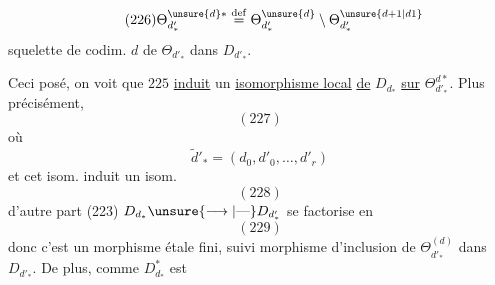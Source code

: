 \[
\tag{226}
\Theta_{d'_*}^{\unsure{d}*}\overset{\mathrm{def}}=
\Theta_{d'_*}^{\unsure{d}}\setminus\Theta_{d'_*}^{\unsure{d+1|d1}}
\]
squelette 
de codim. $d$ de
$\Theta_{d'_*}$ dans $D_{d'_*}$.

Ceci posé, on voit que $225$ \uline{induit}
un  \uline{isomorphisme local}
\uline{de} $D_{d_*}$ \uline{sur}  $\Theta_{d'_*}^{d*}$. Plus
précisément, 
\[
(227)
\]
où 
\[
\widetilde d'_*=(d_0,d'_0,\ldots,d'_r)
\]
et cet isom. induit un isom.
\[
(228)
\]
d'autre part (223) $D_{d_*}\unsure{\longrightarrow|\text{---}}D_{d'_*}$ se
factorise en
\[
(229)
\]
donc c'est un morphisme étale fini,
suivi  morphisme d'inclusion de
$\Theta_{d'_*}^{(d)}$ dans $D_{d'_*}$. De plus, comme $D_{d_*}^{*}$ est
